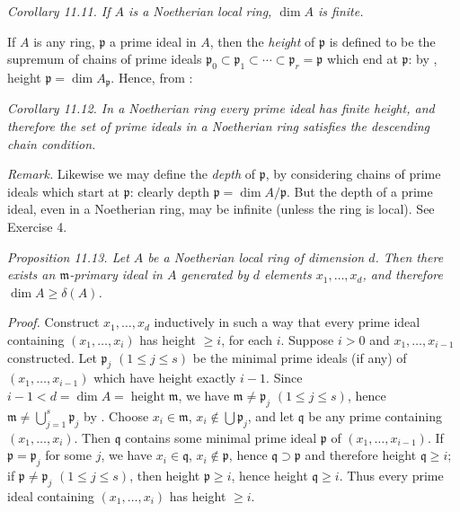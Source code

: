 \medskip
\noindent\textit{Corollary 11.11. If $A$ is a Noetherian local ring, $\dim A$ is finite.} \proofbox

If $A$ is any ring, $\mathfrak p$ a prime ideal in $A$, then the \textit{height} of $\mathfrak p$ is defined to be the supremum of chains of prime ideals $\mathfrak p_0\subset\mathfrak p_1\subset\cdots\subset\mathfrak p_r=\mathfrak p$ which end at $\mathfrak p$: by , height $\mathfrak p=\dim A_{\mathfrak p}$. Hence, from :

\medskip
\noindent\textit{Corollary 11.12. In a Noetherian ring every prime ideal has finite height, and therefore the set of prime ideals in a Noetherian ring satisfies the descending chain condition.} \proofbox

\textit{Remark.} Likewise we may define the \textit{depth} of $\mathfrak p$, by considering chains of prime ideals which start at $\mathfrak p$: clearly depth $\mathfrak p=\dim A/\mathfrak p$. But the depth of a prime ideal, even in a Noetherian ring, may be infinite (unless the ring is local). See Exercise 4.

\medskip
\noindent\textit{Proposition 11.13. Let $A$ be a Noetherian local ring of dimension $d$. Then there exists an $\mathfrak m$-primary ideal in $A$ generated by $d$ elements $x_1,\ldots,x_d$, and therefore $\dim A\geq\delta(A)$.}

\textit{Proof.} Construct $x_1,\ldots,x_d$ inductively in such a way that every prime ideal containing $(x_1,\ldots,x_i)$ has height $\geq i$, for each $i$. Suppose $i>0$ and $x_1,\ldots,x_{i-1}$ constructed. Let $\mathfrak p_j$ $(1\leq j\leq s)$ be the minimal prime ideals (if any) of $(x_1,\ldots,x_{i-1})$ which have height exactly $i-1$. Since $i-1<d=\dim A=\operatorname{height}\mathfrak m$, we have $\mathfrak m\neq\mathfrak p_j$ $(1\leq j\leq s)$, hence $\mathfrak m\neq\bigcup_{j=1}^s\mathfrak p_j$ by . Choose $x_i\in\mathfrak m$, $x_i\notin\bigcup\mathfrak p_j$, and let $\mathfrak q$ be any prime containing $(x_1,\ldots,x_i)$. Then $\mathfrak q$ contains some minimal prime ideal $\mathfrak p$ of $(x_1,\ldots,x_{i-1})$. If $\mathfrak p=\mathfrak p_j$ for some $j$, we have $x_i\in\mathfrak q$, $x_i\notin\mathfrak p$, hence $\mathfrak q\supset\mathfrak p$ and therefore height $\mathfrak q\geq i$; if $\mathfrak p\neq\mathfrak p_j$ $(1\leq j\leq s)$, then height $\mathfrak p\geq i$, hence height $\mathfrak q\geq i$. Thus every prime ideal containing $(x_1,\ldots,x_i)$ has height $\geq i$.

